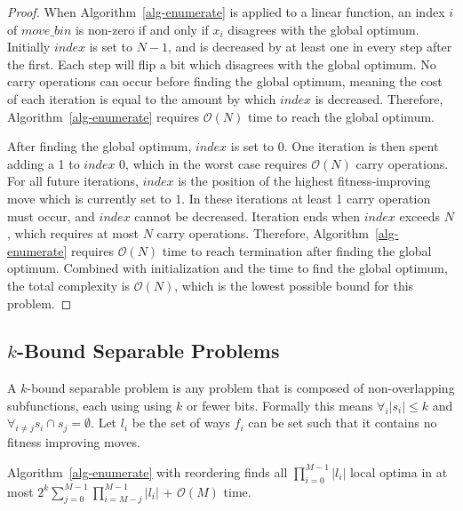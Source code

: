 \documentclass[runningheads,a4paper]{llncs}
\newcommand{\BigO}[1]{$\mathcal{O}{(#1)}$}
\begin{document}
\begin{proof}
When Algorithm~\ref{alg-enumerate} is applied to a linear
function, an index $i$ of $move\_bin$ is non-zero if and only if
$x_i$ disagrees with the global optimum.
Initially $index$ is set to $N-1$, and is decreased by at least one in every step after the first.
Each step will flip a bit which disagrees with the global optimum.
No carry operations can occur before finding the global optimum, meaning the
cost of each iteration is equal to the amount by which $index$ is decreased.
Therefore, Algorithm~\ref{alg-enumerate} requires \BigO{N} time to reach
the global optimum.

After finding the global optimum, $index$ is set to 0. One iteration
is then spent adding a 1 to $index$ 0, which in the worst case requires \BigO{N}
carry operations. For all future iterations, $index$ is the position of the highest fitness-improving move
which is currently set to 1. In these iterations at least 1 carry operation must
occur, and $index$ cannot be decreased. Iteration ends when $index$ exceeds $N$,
which requires at most $N$ carry operations. Therefore, Algorithm~\ref{alg-enumerate}
requires \BigO{N} time to reach termination after finding the global optimum. Combined
with initialization and the time to find the global optimum, the total complexity is \BigO{N},
which is the lowest possible bound for this problem.
\end{proof}

\subsection{$k$-Bound Separable Problems}
A $k$-bound separable problem is any problem that is composed of non-overlapping
subfunctions, each using using $k$ or fewer bits. Formally this means
$\forall_i |s_i| \leq k$ and $\forall_{i \neq j} s_i \cap s_j = \emptyset$.
Let $l_i$ be the set of ways $f_i$ can be set
such that it contains no fitness improving moves.

\begin{theorem}
\label{theorem-k-bound-general}
Algorithm~\ref{alg-enumerate} with reordering finds all $\prod_{i=0}^{M-1} |l_i|$ local optima
in at most $2^k\sum_{j=0}^{M-1} \prod_{i=M-j}^{M-1} |l_i|$ + \BigO{M} time.
\end{theorem}
\end{document}
